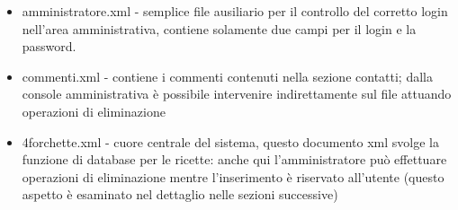 \documentclass[12pt]{article}
\begin{document}
		\begin{itemize}
		\item  amministratore.xml - semplice file ausiliario per il controllo del corretto login nell'area amministrativa, contiene solamente due campi per il login e la password.
		
		\item commenti.xml - contiene i commenti contenuti nella sezione contatti; dalla console amministrativa è possibile intervenire indirettamente sul file attuando operazioni di eliminazione
		
		\item 4forchette.xml - cuore centrale del sistema, questo documento xml svolge la funzione di database per le ricette: anche qui l'amministratore può effettuare operazioni di eliminazione mentre l'inserimento è riservato all'utente (questo aspetto \`e esaminato nel dettaglio nelle sezioni successive)
		\end{itemize}				
					
\end{document}
